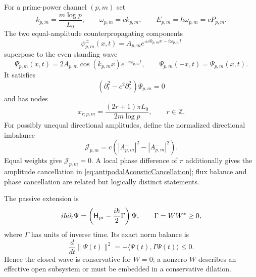 \documentclass[11pt]{amsart}
\theoremstyle{definition}
\theoremstyle{remark}
\begin{document}
For a prime-power channel $(p,m)$ set
\begin{equation}\label{eq:relativisticPrimeDispersion}
 k_{p,m}=\frac{m\log p}{L_0},
 \qquad
 \omega_{p,m}=ck_{p,m},
 \qquad
 E_{p,m}=\hbar\omega_{p,m}=cP_{p,m}.
\end{equation}
The two equal-amplitude counterpropagating components
\begin{equation}\label{eq:counterpropagatingPrimeBranches}
 \psi_{p,m}^{\pm}(x,t)
 =A_{p,m}e^{\pm ik_{p,m}x-i\omega_{p,m}t}
\end{equation}
superpose to the even standing wave
\begin{equation}\label{eq:relativisticPrimeStandingWave}
 \Psi_{p,m}(x,t)
 =2A_{p,m}\cos(k_{p,m}x)e^{-i\omega_{p,m}t},
 \qquad
 \Psi_{p,m}(-x,t)=\Psi_{p,m}(x,t).
\end{equation}
It satisfies
\begin{equation}\label{eq:primeWaveEquation}
 \left(\partial_t^2-c^2\partial_x^2\right)\Psi_{p,m}=0
\end{equation}
and has nodes
\begin{equation}\label{eq:primeWaveNodes}
 x_{r;p,m}=\frac{(2r+1)\pi L_0}{2m\log p},
 \qquad r\in\mathbb Z.
\end{equation}
For possibly unequal directional amplitudes, define the normalized directional imbalance
\begin{equation}\label{eq:directionalFluxBalance}
 \mathcal J_{p,m}=c\left(|A_{p,m}^{+}|^2-|A_{p,m}^{-}|^2\right).
\end{equation}
Equal weights give $\mathcal J_{p,m}=0$.  A local phase difference of $\pi$ additionally
gives the amplitude cancellation in \eqref{eq:antipodalAcousticCancellation}; flux balance
and phase cancellation are related but logically distinct statements.

The passive extension is
\begin{equation}\label{eq:relativisticPassiveEvolution}
 i\hbar\partial_t\Psi
 =\left(\mathsf H_{\rm pr}-\frac{i\hbar}{2}\Gamma\right)\Psi,
 \qquad
 \Gamma=WW^*\ge0,
\end{equation}
where $\Gamma$ has units of inverse time.  Its exact norm balance is
\begin{equation}\label{eq:passiveNormBalance}
 \frac{d}{dt}\|\Psi(t)\|^2
 =-\langle\Psi(t),\Gamma\Psi(t)\rangle\le0.
\end{equation}
Hence the closed wave is conservative for $W=0$; a nonzero $W$ describes an effective open
subsystem or must be embedded in a conservative dilation.
\end{document}
